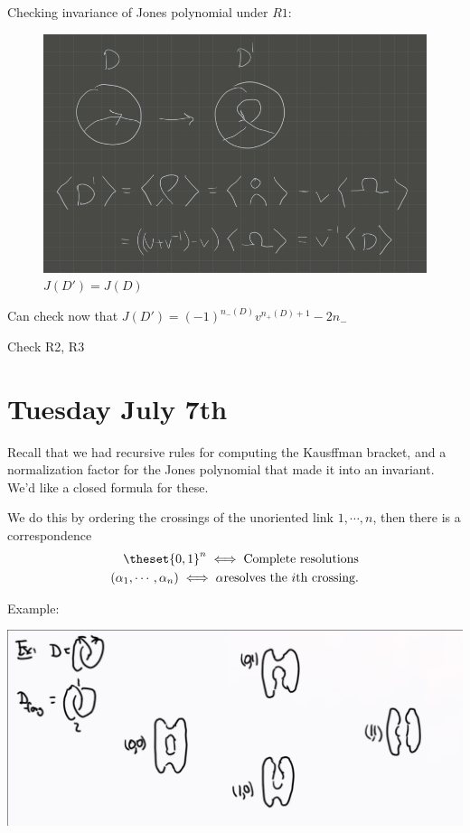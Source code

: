 Checking invariance of Jones polynomial under \(R1\):

\begin{figure}
\centering
\includegraphics{figures/image_2020-07-06-11-54-27.png}
\caption{\(J(D') = J(D)\)}
\end{figure}

Can check now that \(J(D') = (-1)^{n_-(D)} v^{n_+(D) + 1} - 2n_-\)

\begin{description}
\tightlist
\item[Exercise]
Check R2, R3
\end{description}

\hypertarget{tuesday-july-7th}{%
\section{Tuesday July 7th}\label{tuesday-july-7th}}

Recall that we had recursive rules for computing the Kausffman bracket,
and a normalization factor for the Jones polynomial that made it into an
invariant. We'd like a closed formula for these.

We do this by ordering the crossings of the unoriented link
\(1, \cdots, n\), then there is a correspondence \begin{align*}
\theset{0, 1}^n \iff \text{Complete resolutions} \\
(\alpha_1, \cdots, \alpha_n) \iff \alpha \text{resolves the $i$th crossing}
.\end{align*}

Example:

\includegraphics{figures/image_2020-07-07-11-07-33.png}

